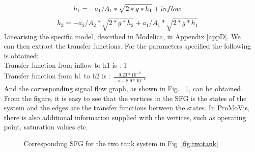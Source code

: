 \begin{equation}
    \dot{h_1} = -a_1/A_1*\sqrt{2*g*h_1} + inflow\\\newline
\end{equation}
\begin{equation}
	\dot{h_2} = -a_2/A_2*\sqrt{2*g*h_2} + a_1/A_1*\sqrt{2*g*h_1}
\end{equation}
Linearising the specific model, described in Modelica,  in Appendix \ref{appD}. We can then extract the transfer functions. For the parameters specified the following is obtained:\\\newline
Transfer function from inflow to h1 is : 1\\
Transfer function from h1 to h2 is :$\begin{array}{rcl} \frac{0.23*10^{-2}}{-s -8.9*10^{-2}} \end{array}$\\\newline
And the corresponding signal flow graph, as shown in Fig. ~\ref{fig:sfg}, can be obtained. From the figure, it is easy to see that the vertices in the SFG is the states of the system and the edges are the transfer functions between the states. In ProMoVis, there is also additional information supplied with the vertices, such as operating point, saturation values etc. 
\begin{figure}
\caption{Corresponding SFG for the two tank system in Fig~\ref{fig:twotank}}
\label{fig:sfg}
\end{figure}
